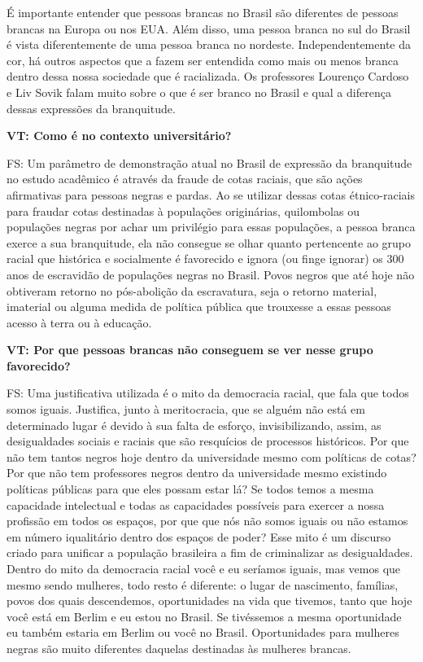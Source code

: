 \documentclass[a4paper,
fontsize=11pt,
oneside,
numbers=noperiodatend,
parskip=half-,
bibliography=totoc,
final
]{scrartcl}
\begin{document}
É importante entender que pessoas brancas no Brasil são diferentes de
pessoas brancas na Europa ou nos EUA. Além disso, uma pessoa branca no
sul do Brasil é vista diferentemente de uma pessoa branca no nordeste.
Independentemente da cor, há outros aspectos que a fazem ser entendida
como mais ou menos branca dentro dessa nossa sociedade que é
racializada. Os professores Lourenço Cardoso e Liv Sovik falam muito
sobre o que é ser branco no Brasil e qual a diferença dessas expressões
da branquitude.

\textbf{VT: Como é no contexto universitário?}

FS: Um parâmetro de demonstração atual no Brasil de expressão da
branquitude no estudo acadêmico é através da fraude de cotas raciais,
que são ações afirmativas para pessoas negras e pardas. Ao se utilizar
dessas cotas étnico-raciais para fraudar cotas destinadas à populações
originárias, quilombolas ou populações negras por achar um privilégio
para essas populações, a pessoa branca exerce a sua branquitude, ela não
consegue se olhar quanto pertencente ao grupo racial que histórica e
socialmente é favorecido e ignora (ou finge ignorar) os 300 anos de
escravidão de populações negras no Brasil. Povos negros que até hoje não
obtiveram retorno no pós-abolição da escravatura, seja o retorno
material, imaterial ou alguma medida de política pública que trouxesse a
essas pessoas acesso à terra ou à educação.

\textbf{VT: Por que pessoas brancas não conseguem se ver nesse grupo
favorecido?}

FS: Uma justificativa utilizada é o mito da democracia racial, que fala
que todos somos iguais. Justifica, junto à meritocracia, que se alguém
não está em determinado lugar é devido à sua falta de esforço,
invisibilizando, assim, as desigualdades sociais e raciais que são
resquícios de processos históricos. Por que não tem tantos negros hoje
dentro da universidade mesmo com políticas de cotas? Por que não tem
professores negros dentro da universidade mesmo existindo políticas
públicas para que eles possam estar lá? Se todos temos a mesma
capacidade intelectual e todas as capacidades possíveis para exercer a
nossa profissão em todos os espaços, por que que nós não somos iguais ou
não estamos em número iqualitário dentro dos espaços de poder? Esse mito
é um discurso criado para unificar a população brasileira a fim de
criminalizar as desigualdades. Dentro do mito da democracia racial você
e eu seríamos iguais, mas vemos que mesmo sendo mulheres, todo resto é
diferente: o lugar de nascimento, famílias, povos dos quais descendemos,
oportunidades na vida que tivemos, tanto que hoje você está em Berlim e
eu estou no Brasil. Se tivéssemos a mesma oportunidade eu também estaria
em Berlim ou você no Brasil. Oportunidades para mulheres negras são
muito diferentes daquelas destinadas às mulheres brancas.
\end{document}
